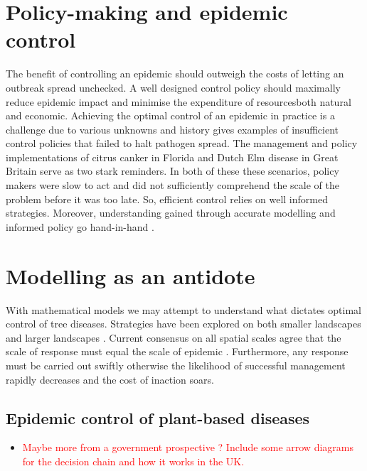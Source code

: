 \section{Policy-making and epidemic control}


The benefit of controlling an epidemic should outweigh the costs of letting an outbreak spread unchecked. A well designed control policy should maximally reduce epidemic impact and minimise the expenditure of resources\textemdash both natural and economic. Achieving the optimal control of an epidemic in practice is a challenge due to various unknowns \cite{13-challenges} and history gives examples of insufficient control policies that failed to halt pathogen spread. The management and policy implementations of citrus canker in Florida \cite{schubert2001meeting} and Dutch Elm disease in Great Britain \cite{dutch-elm-mismanage} serve as two stark reminders. In both of these these scenarios, policy makers were slow to act and did not sufficiently comprehend the scale of the problem before it was too late. So, efficient control relies on well informed strategies. Moreover, understanding gained through accurate modelling and informed policy go hand-in-hand \cite{jones2020modelling}.\\

\section{Modelling as an antidote}
With mathematical models we may attempt to understand what dictates optimal control of tree diseases. Strategies have been explored on both smaller landscapes \cite{WEBIDEMICS, risk-potential-control} and larger landscapes \cite{large-scale-control, large-scale-control2}. Current consensus on all spatial scales agree that the scale of response must equal the scale of epidemic \cite{control-scale-matching}. Furthermore, any response must be carried out swiftly otherwise the likelihood of successful management rapidly decreases and the cost of inaction soars.

\subsection{Epidemic control of plant-based diseases}
\begin{itemize}
    \item \textcolor{red}{Maybe more from a government prospective ? Include some arrow diagrams for the decision chain and how it works in the UK.}
\end{itemize}

